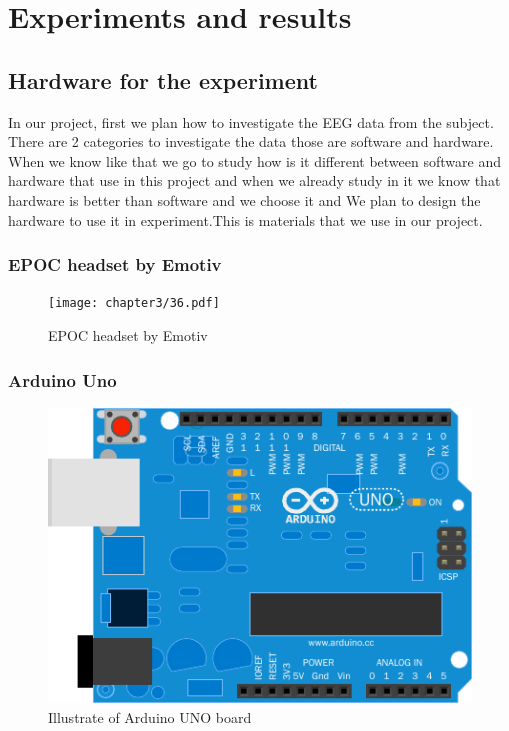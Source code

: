 \chapter{Experiments and results}

\label{ch:Experiments and results}

\setlength{\parindent}{4em}
\setlength{\parskip}{1em}
\renewcommand{\baselinestretch}{1.5}

\section{Hardware for the experiment}

\hspace{1.5cm} In our project, first we plan how to investigate the EEG data from the subject. There are 2 categories to investigate the data those are software and hardware. When we know like that we go to study how is it different between software and hardware that use in this project and when we already study in it we know that hardware is better than software and we choose it and We plan to design the hardware to use it in experiment.This is materials that we use in our project.

\subsection{EPOC headset by Emotiv\texttrademark}
\begin{figure}[ht]
	\centering
	\texttt{[image: chapter3/36.pdf]}
	\caption{EPOC headset by Emotiv\texttrademark}
\end{figure}

\subsection{Arduino Uno}
\begin{figure}[ht]
	\centering
	\includegraphics[scale = 0.8]{chapter3/38.pdf}
	\caption{Illustrate of Arduino UNO board}
\end{figure}

